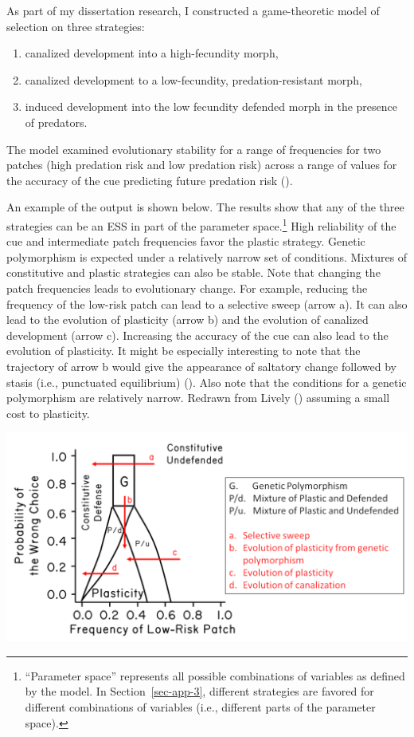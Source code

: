 \documentclass[
  letterpaper,
]{book}
\begin{document}
As part of my dissertation research, I constructed a game-theoretic
model of selection on three strategies:

\begin{enumerate}
\def\labelenumi{\arabic{enumi}.}
\item
  canalized development into a high-fecundity morph,
\item
  canalized development to a low-fecundity, predation-resistant morph,
\item
  induced development into the low fecundity defended morph in the
  presence of predators.
\end{enumerate}

The model examined evolutionary stability for a range of frequencies for
two patches (high predation risk and low predation risk) across a range
of values for the accuracy of the cue predicting future predation risk
().

An example of the output is shown below. The results show that any of
the three strategies can be an ESS in part of the parameter
space.\footnote{``Parameter space'' represents all possible combinations
  of variables as defined by the model. In Section~\ref{sec-app-3},
  different strategies are favored for different combinations of
  variables (i.e., different parts of the parameter space).} High
reliability of the cue and intermediate patch frequencies favor the
plastic strategy. Genetic polymorphism is expected under a relatively
narrow set of conditions. Mixtures of constitutive and plastic
strategies can also be stable. Note that changing the patch frequencies
leads to evolutionary change. For example, reducing the frequency of the
low-risk patch can lead to a selective sweep (arrow a). It can also lead
to the evolution of plasticity (arrow b) and the evolution of canalized
development (arrow c). Increasing the accuracy of the cue can also lead
to the evolution of plasticity. It might be especially interesting to
note that the trajectory of arrow b would give the appearance of
saltatory change followed by stasis (i.e., punctuated equilibrium)
(). Also note that the
conditions for a genetic polymorphism are relatively narrow. Redrawn
from Lively () assuming a small cost to
plasticity.

\includegraphics{images/fig3-7_hr.png}
\end{document}
